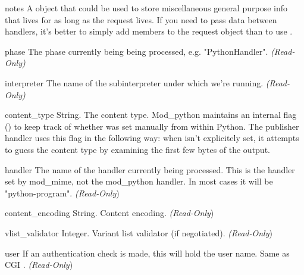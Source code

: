 \begin{memberdesc}[request]{notes}
A  object that could be used to store miscellaneous
general purpose info that lives for as long as the request lives. If
you need to pass data between handlers, it's better to simply add
members to the request object than to use .
\end{memberdesc}

\begin{memberdesc}[request]{phase}
The phase currently being being processed, e.g. "PythonHandler".
\emph{(Read-Only)}
\end{memberdesc}

\begin{memberdesc}[request]{interpreter}
The name of the subinterpreter under which we're running.
\emph{(Read-Only)}
\end{memberdesc}

\begin{memberdesc}[request]{content_type}
String. The content type. Mod_python maintains an internal flag
() to keep track of whether
 was set manually from within Python. The
publisher handler uses this flag in the following way: when
 isn't explicitely set, it attempts to guess the
content type by examining the first few bytes of the output.
\end{memberdesc}

\begin{memberdesc}[request]{handler}
The name of the handler currently being processed. This is the handler
set by mod_mime, not the mod_python handler. In most cases it will be
"python-program". \emph{(Read-Only})
\end{memberdesc}

\begin{memberdesc}[request]{content_encoding}
String. Content encoding.
\emph{(Read-Only})
\end{memberdesc}

\begin{memberdesc}[request]{vlist_validator}
Integer. Variant list validator (if negotiated).
\emph{(Read-Only})
\end{memberdesc}

\begin{memberdesc}[request]{user}
If an authentication check is made, this will hold the user
name. Same as CGI .
\emph{(Read-Only})
\end{memberdesc}

